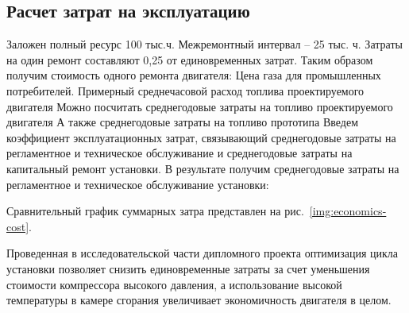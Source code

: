 \subsection{Расчет затрат на эксплуатацию}
Заложен полный ресурс 100 тыс.ч. Межремонтный интервал – 25 тыс. ч. Затраты на один ремонт составляют 0,25 от единовременных затрат.
Таким образом получим стоимость одного ремонта двигателя:
Цена газа для промышленных потребителей.
Примерный среднечасовой расход топлива проектируемого двигателя
Можно посчитать среднегодовые затраты на топливо проектируемого двигателя
А также среднегодовые затраты на топливо прототипа
Введем коэффициент эксплуатационных затрат, связывающий среднегодовые затраты на регламентное и
техническое обслуживание и среднегодовые затраты на капитальный ремонт установки. В результате получим среднегодовые
затраты на регламентное и техническое обслуживание установки:

Сравнительный график суммарных затра представлен на рис.~\ref{img:economics-cost}.

Проведенная в исследовательской части дипломного проекта оптимизация цикла установки позволяет снизить единовременные
затраты за счет уменьшения стоимости компрессора высокого давления, а использование высокой температуры в камере сгорания
увеличивает экономичность двигателя в целом.